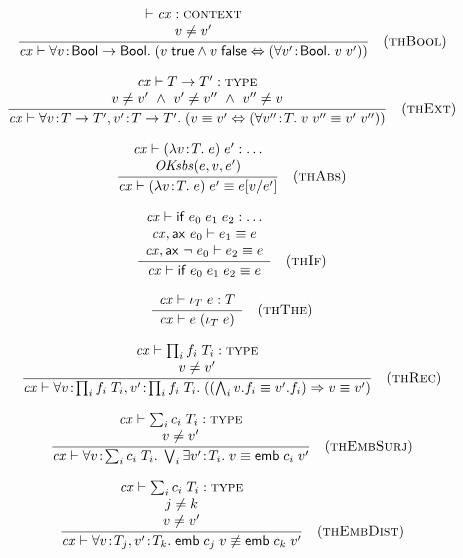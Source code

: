 \[
\frac{\begin{array}{c}\vdash\mathit{cx}:\textsc{context}\\v\neq v'\end{array}}{\mathit{cx}\vdash\forall v\!:\!\mathsf{Bool}\to\mathsf{Bool}.\;(v\;\mathsf{true}\wedge v\;\mathsf{false}\Leftrightarrow(\forall v'\!:\!\mathsf{Bool}.\;v\;v'))}\quad\mbox{(\textsc{thBool})}
\]


\[
\frac{\begin{array}{c}\mathit{cx}\vdash T\to T':\textsc{type}\\v\neq v'\ \wedge\ v'\neq v''\ \wedge\ v''\neq v\end{array}}{\mathit{cx}\vdash\forall v\!:\!T\to T',v'\!:\!T\to T'.\;(v\equiv v'\Leftrightarrow(\forall v''\!:\!T.\;v\;v''\equiv v'\;v''))}\quad\mbox{(\textsc{thExt})}
\]

\[
\frac{\begin{array}{c}\mathit{cx}\vdash(\lambda v\!:\!T.\;e)\;e':\ldots\\\mathit{OKsbs}(e,v,e')\end{array}}{\mathit{cx}\vdash(\lambda v\!:\!T.\;e)\;e'\equiv e[v/e']}\quad\mbox{(\textsc{thAbs})}
\]

\[
\frac{\begin{array}{c}\mathit{cx}\vdash\mathsf{if}\;e_0\;e_1\;e_2:\ldots\\\mathit{cx},\mathsf{ax}\ e_0\vdash e_1\equiv e\\\mathit{cx},\mathsf{ax}\ \neg\;e_0\vdash e_2\equiv e\end{array}}{\mathit{cx}\vdash\mathsf{if}\;e_0\;e_1\;e_2\equiv e}\quad\mbox{(\textsc{thIf})}
\]

\[
\frac{\begin{array}{c}\mathit{cx}\vdash\iota_{T}\;e:T\end{array}}{\mathit{cx}\vdash e\;(\iota_{T}\;e)}\quad\mbox{(\textsc{thThe})}
\]

\[
\frac{\begin{array}{c}\mathit{cx}\vdash\prod_{i}f_i\;T_i:\textsc{type}\\v\neq v'\end{array}}{\mathit{cx}\vdash\forall v\!:\!\prod_{i}f_i\;T_i,v'\!:\!\prod_{i}f_i\;T_i.\;((\bigwedge_{i}v.f_i\equiv v'.f_i)\Rightarrow v\equiv v')}\quad\mbox{(\textsc{thRec})}
\]

\[
\frac{\begin{array}{c}\mathit{cx}\vdash\sum_{i}c_i\;T_i:\textsc{type}\\v\neq v'\end{array}}{\mathit{cx}\vdash\forall v\!:\!\sum_{i}c_i\;T_i.\;\bigvee_{i}\exists v'\!:\!T_i.\;v\equiv\mathsf{emb}\;{c_i}\;v'}\quad\mbox{(\textsc{thEmbSurj})}
\]

\[
\frac{\begin{array}{c}\mathit{cx}\vdash\sum_{i}c_i\;T_i:\textsc{type}\\j\neq k\\v\neq v'\end{array}}{\mathit{cx}\vdash\forall v\!:\!T_j,v'\!:\!T_k.\;\mathsf{emb}\;{c_j}\;v\not\equiv\mathsf{emb}\;{c_k}\;v'}\quad\mbox{(\textsc{thEmbDist})}
\]

